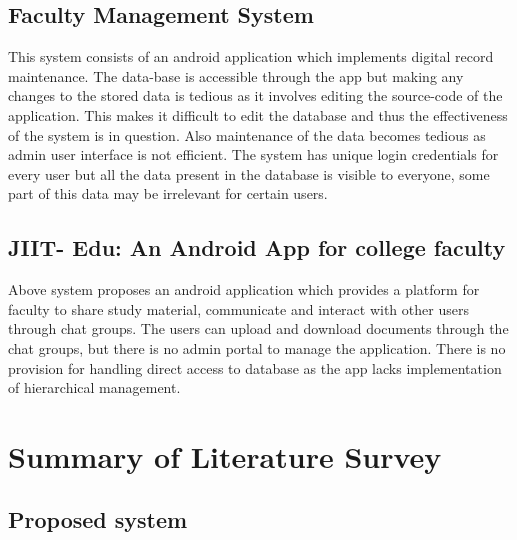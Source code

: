 \documentclass[BTech]{srmuthesis}
\begin{document}
\subsection{Faculty Management System}
This system consists of an android application which implements digital record maintenance.
The data-base is accessible through the app but making any changes to the stored data is
tedious as it involves editing the source-code of the application. This makes it difficult to edit
the database and thus the effectiveness of the system is in question. Also maintenance of the
data becomes tedious as admin user interface is not efficient. The system has unique login
credentials for every user but all the data present in the database is visible to everyone, some
part of this data may be irrelevant for certain users.
\subsection{JIIT- Edu: An Android App for college faculty}
Above system proposes an android application which provides a platform for faculty to share
study material, communicate and interact with other users through chat groups. The users can
upload and download documents through the chat groups, but there is no admin portal to
manage the application. There is no provision for handling direct access to database as the app
lacks implementation of hierarchical management.
\section{Summary of Literature Survey}
\subsection{Proposed system}
\end{document}
